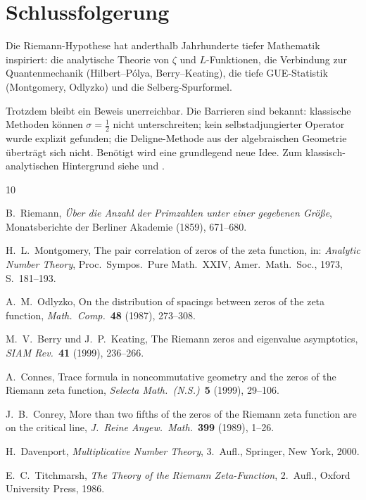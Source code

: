 \documentclass[12pt,a4paper]{amsart}
\theoremstyle{definition}
\begin{document}
\section{Schlussfolgerung}

Die Riemann-Hypothese hat anderthalb Jahrhunderte tiefer Mathematik
inspiriert: die analytische Theorie von $\zeta$ und $L$-Funktionen,
die Verbindung zur Quantenmechanik (Hilbert--P\'olya, Berry--Keating),
die tiefe GUE-Statistik (Montgomery, Odlyzko) und die Selberg-Spurformel.

Trotzdem bleibt ein Beweis unerreichbar. Die Barrieren sind bekannt:
klassische Methoden k\"onnen $\sigma = \tfrac{1}{2}$ nicht unterschreiten;
kein selbstadjungierter Operator wurde explizit gefunden;
die Deligne-Methode aus der algebraischen Geometrie \"ubertr\"agt sich nicht.
Ben\"otigt wird eine grundlegend neue Idee.
Zum klassisch-analytischen Hintergrund siehe \cite{Davenport2000} und \cite{Titchmarsh1986}.

\begin{thebibliography}{10}

B.~Riemann,
\emph{\"Uber die Anzahl der Primzahlen unter einer gegebenen Gr\"o\ss e},
Monatsberichte der Berliner Akademie (1859), 671--680.

H.~L.~Montgomery,
The pair correlation of zeros of the zeta function,
in: \emph{Analytic Number Theory}, Proc.\ Sympos.\ Pure Math.~XXIV,
Amer.\ Math.\ Soc., 1973, S.~181--193.

A.~M.~Odlyzko,
On the distribution of spacings between zeros of the zeta function,
\emph{Math.\ Comp.}\ \textbf{48} (1987), 273--308.

M.~V.~Berry und J.~P.~Keating,
The Riemann zeros and eigenvalue asymptotics,
\emph{SIAM Rev.}\ \textbf{41} (1999), 236--266.

A.~Connes,
Trace formula in noncommutative geometry and the zeros of the Riemann
zeta function,
\emph{Selecta Math.\ (N.S.)}\ \textbf{5} (1999), 29--106.

J.~B.~Conrey,
More than two fifths of the zeros of the Riemann zeta function are on
the critical line,
\emph{J.\ Reine Angew.\ Math.}\ \textbf{399} (1989), 1--26.

H.~Davenport,
\emph{Multiplicative Number Theory}, 3.~Aufl.,
Springer, New York, 2000.

E.~C.~Titchmarsh,
\emph{The Theory of the Riemann Zeta-Function}, 2.~Aufl.,
Oxford University Press, 1986.

\end{thebibliography}
\end{document}
